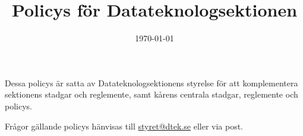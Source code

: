 \documentclass{dtek}
\title{Policys för Datateknologsektionen}
\author{}
\date{\today}
\begin{document}
\makeheadfoot

\begin{center}
\maketitle
\end{center}
Dessa policys är satta av Datateknologsektionens styrelse för att komplementera sektionens stadgar och reglemente, samt kårens centrala stadgar, reglemente och policys.

Frågor gällande policys hänvisas till \hyperlink{mailto:styret@dtek.se}{styret@dtek.se} eller via post.

\setcounter{tocdepth}{1}
\tableofcontents

%
\newpage

\newpage

\newpage

\end{document}
